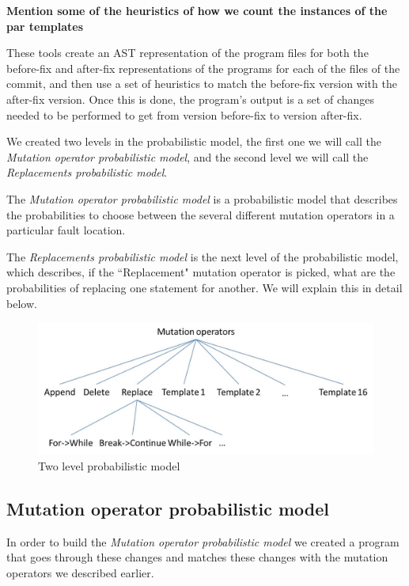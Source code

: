\documentclass[conference]{IEEEtran}
\newcommand{\todo}[1]
  {{\scriptsize \textbf{\color{red} {#1}}}}
\begin{document}
\todo{Mention some of the heuristics of how we count the instances of the par templates}

These tools create an AST representation of the program files for both the 
before-fix and after-fix representations of the programs for each of the files 
of the commit, and then use a set of heuristics to match the before-fix version 
with the after-fix version. Once this is done, the program's output is a set of 
changes needed to be performed to get from version before-fix to version 
after-fix.

We created two levels in the probabilistic model, the first one we will call the 
\textit{Mutation operator probabilistic model}, and the second level we will 
call the \textit{Replacements probabilistic model}.

The \textit{Mutation operator probabilistic model} is a probabilistic model that 
describes the probabilities to choose between the several different mutation 
operators in a particular fault location.

The \textit{Replacements probabilistic model} is the next level of the 
probabilistic model, which describes, if the ``Replacement" mutation operator is 
picked, what are the probabilities of replacing one statement for another. We 
will explain this in detail below.


\begin{figure}[!h]
  \centering
    \includegraphics[scale=0.4]{Picture2}
  \caption{Two level probabilistic model}
  \label{fig:probModel}
\end{figure}

\subsection{Mutation operator probabilistic model}
In order to build the \textit{Mutation operator probabilistic model} we created 
a program that goes through these 
changes and matches these changes with the mutation operators we described 
earlier.
\end{document}
